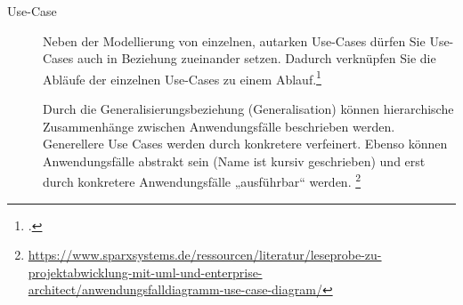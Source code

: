 \documentclass{bschlangaul-theorie}
\begin{document}
\begin{description}

%

\item[Use-Case]

\begin{center}
\end{center}

Neben der Modellierung von einzelnen, autarken Use-Cases dürfen Sie
Use-Cases auch in Beziehung zueinander setzen. Dadurch verknüpfen Sie
die Abläufe der einzelnen Use-Cases zu einem Ablauf.\footcite[Seite 248]{rupp}

Durch die Generalisierungsbeziehung (Generalisation) können
hierarchische Zusammenhänge zwischen Anwendungsfälle beschrieben werden.
Generellere Use Cases werden durch konkretere verfeinert. Ebenso können
Anwendungsfälle abstrakt sein (Name ist kursiv geschrieben) und erst
durch konkretere Anwendungsfälle „ausführbar“ werden.
\footnote{\url{https://www.sparxsystems.de/ressourcen/literatur/leseprobe-zu-projektabwicklung-mit-uml-und-enterprise-architect/anwendungsfalldiagramm-use-case-diagram/}}

\begin{center}
\end{center}

%


\end{description}
\end{document}
